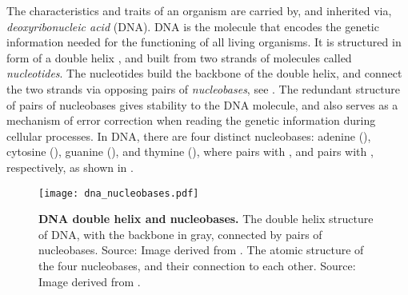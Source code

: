 
The characteristics and traits of an organism are carried by, and inherited via, \emph{deoxyribonucleic acid} (DNA).
DNA is the molecule that encodes the genetic information needed for the functioning of all living organisms.
It is structured in form of a double helix \cite{Watson1953},
and built from two strands of molecules called \emph{nucleotides}.
The nucleotides build the backbone of the double helix,
and connect the two strands via opposing pairs of \emph{nucleobases}, see .
The redundant structure of pairs of nucleobases gives stability to the DNA molecule,
and also serves as a mechanism of error correction when reading the genetic information during cellular processes.
In DNA, there are four distinct nucleobases:
adenine (), cytosine (), guanine (), and thymine (),
where  pairs with , and  pairs with , respectively,
as shown in .

\begin{figure}[hpbt]
    \centering
    \texttt{[image: dna\_nucleobases.pdf]}
    \begin{subfigure}{0pt}
        \label{fig:dna_nucleobases:sub:dna_helix}
    \end{subfigure}
    \begin{subfigure}{0pt}
        \label{fig:dna_nucleobases:sub:nucleobases}
    \end{subfigure}
    \caption[DNA double helix and nucleobases]{
        \textbf{DNA double helix and nucleobases.}
        The double helix structure of DNA, with the backbone in gray,
        connected by pairs of nucleobases.
        Source: Image derived from \cite{Sponk2010}.
        The atomic structure of the four nucleobases, and their connection to each other.
        Source: Image derived from \cite{Yikrazuul2008a,Yikrazuul2008b}.
    }
    \label{fig:dna_nucleobases}
\end{figure}

